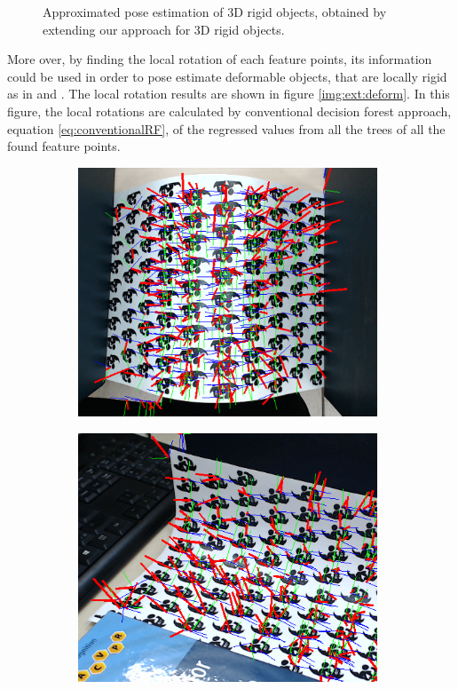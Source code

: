 \documentclass[annual]{acmsiggraph}
\begin{document}
\begin{figure}[h]
\caption{Approximated pose estimation of 3D rigid objects, obtained by extending our approach for 3D rigid objects.}
\label{img:ext:3d}
\end{figure}

More over, by finding the local rotation of each feature points, its information could be used in order to pose estimate deformable objects, that are locally rigid as in \cite{} and \cite{}. The local rotation results are shown in figure \ref{img:ext:deform}. In this figure, the local rotations are calculated by conventional decision forest approach, equation \eqref{eq:conventionalRF}, of the regressed values from all the trees of all the found feature points.  

\begin{figure}[h]
\center
\begin{subfigure}[c]{0.49\columnwidth} \includegraphics[width=0.98\textwidth]{images/deform_local_result_1.png} \end{subfigure}%
\begin{subfigure}[c]{0.49\columnwidth} \includegraphics[width=0.98\textwidth]{images/deform_local_result_2.png} \end{subfigure}%

\end{figure}
\end{document}
